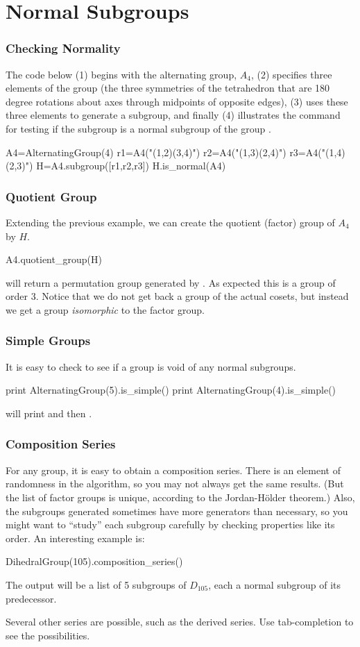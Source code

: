 \documentclass[12pt]{article}
\newcommand{\sageinline}[1]{\lit*{#1}}
\newcommand{\sagetopic}[1]{\subsubsection*{#1}}
\begin{document}
\section*{Normal Subgroups}
%
\sagetopic{Checking Normality}
The code below (1) begins with the alternating group, $A_4$, (2) specifies three elements of the group (the three symmetries of the tetrahedron that are 180 degree rotations about axes through midpoints of opposite edges), (3) uses these three elements to generate a subgroup, and finally (4) illustrates the command for testing if the subgroup \sageinline{H} is a normal subgroup of the group \sageinline{A4}.
%
\begin{sageverbatim}
A4=AlternatingGroup(4)
r1=A4("(1,2)(3,4)") 
r2=A4("(1,3)(2,4)")
r3=A4("(1,4)(2,3)")
H=A4.subgroup([r1,r2,r3])
H.is_normal(A4)
\end{sageverbatim}
%
%
\sagetopic{Quotient Group}
Extending the previous example, we can create the quotient (factor) group of $A_4$ by $H$.
%
\begin{sageverbatim}
A4.quotient_group(H)
\end{sageverbatim}
%
will return a permutation group generated by \sageinline{(1,2,3)}.  As expected this is a group of order 3.  Notice that we do not get back a group of the actual cosets, but instead we get a group {\em isomorphic} to the factor group.
%
\sagetopic{Simple Groups}
%
It is easy to check to see if a group is void of any normal subgroups.
%
\begin{sageverbatim}
print AlternatingGroup(5).is_simple()
print AlternatingGroup(4).is_simple()
\end{sageverbatim}
%
will print \sageinline{True} and then \sageinline{False}.
%
%
\sagetopic{Composition Series}
%
For any group, it is easy to obtain a composition series.  There is an element of randomness in the algorithm, so you may not always get the same results.  (But the list of factor groups is unique, according to the Jordan-H\"{o}lder theorem.)  Also, the subgroups generated sometimes have more generators than necessary, so you might want to ``study'' each subgroup carefully by checking properties like its order.
%
An interesting example is:  
%
\begin{sageverbatim}
DihedralGroup(105).composition_series()
\end{sageverbatim}
%
The output will be a list of 5 subgroups of $D_{105}$, each a normal subgroup of its predecessor.\par
%
Several other series are possible, such as the derived series.  Use tab-completion to see the possibilities.
\end{document}
